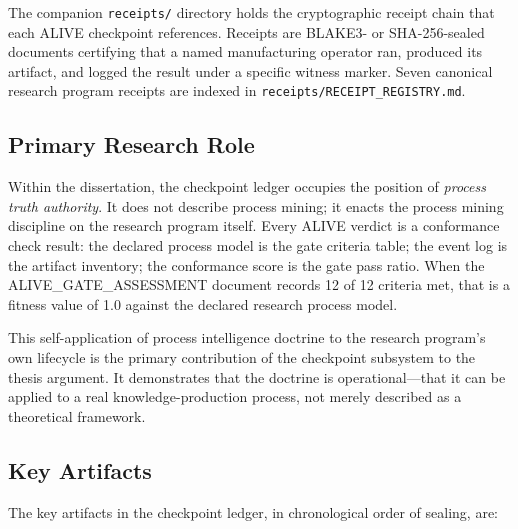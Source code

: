 The companion \texttt{receipts/} directory holds the cryptographic receipt chain that each ALIVE
checkpoint references. Receipts are BLAKE3- or SHA-256-sealed documents certifying that a named
manufacturing operator ran, produced its artifact, and logged the result under a specific witness marker.
Seven canonical research program receipts are indexed in \texttt{receipts/RECEIPT\_REGISTRY.md}.

\subsection{Primary Research Role}
\label{sec:checkpoints-identity-role}

Within the dissertation, the checkpoint ledger occupies the position of \emph{process truth authority}.
It does not describe process mining; it enacts the process mining discipline on the research program
itself. Every ALIVE verdict is a conformance check result: the declared process model is the gate
criteria table; the event log is the artifact inventory; the conformance score is the gate pass ratio.
When the ALIVE\_GATE\_ASSESSMENT document records 12 of 12 criteria met, that is a fitness value of 1.0
against the declared research process model.

This self-application of process intelligence doctrine to the research program's own lifecycle is the
primary contribution of the checkpoint subsystem to the thesis argument. It demonstrates that the
doctrine is operational---that it can be applied to a real knowledge-production process, not merely
described as a theoretical framework.

\subsection{Key Artifacts}
\label{sec:checkpoints-identity-artifacts}

The key artifacts in the checkpoint ledger, in chronological order of sealing, are:

